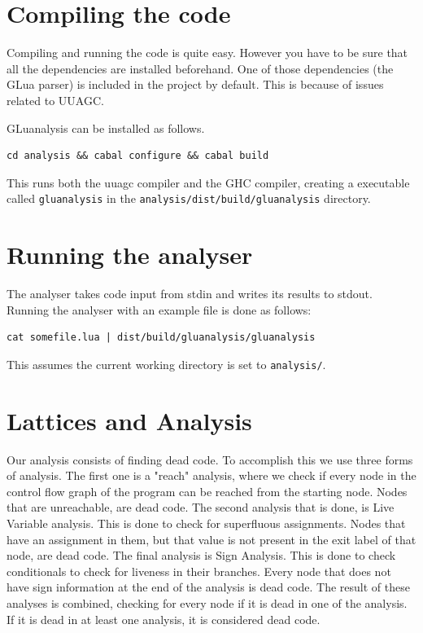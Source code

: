\documentclass[10pt]{article}
\begin{document}
\section{Compiling the code}
Compiling and running the code is quite easy. However you have to be sure that all the dependencies are installed beforehand. One of those dependencies (the GLua parser) is included in the project by default. This is because of issues related to UUAGC.

GLuanalysis can be installed as follows. 
\begin{lstlisting}[frame=single,numbers=none,caption=Compiling the project]
cd analysis && cabal configure && cabal build
\end{lstlisting}

This runs both the uuagc compiler and the GHC compiler, creating a executable called \texttt{gluanalysis} in the \texttt{analysis/dist/build/gluanalysis} directory.

\section{Running the analyser}
The analyser takes code input from stdin and writes its results to stdout. Running the analyser with an example file is done as follows:

\begin{lstlisting}[frame=single,numbers=none,caption=Running with an example file]
cat somefile.lua | dist/build/gluanalysis/gluanalysis
\end{lstlisting}

This assumes the current working directory is set to \texttt{analysis/}.

\section{Lattices and Analysis}
Our analysis consists of finding dead code. To accomplish this we use three forms of analysis. The first one is a "reach" analysis, where we check if every node in the control flow graph of the program can be reached from the starting node. Nodes that are unreachable, are dead code.
The second analysis that is done, is Live Variable analysis. This is done to check for superfluous assignments. Nodes that have an assignment in them, but that value is not present in the exit label of that node, are dead code.
The final analysis is Sign Analysis. This is done to check conditionals to check for liveness in their branches. Every node that does not have sign information at the end of the analysis is dead code.
The result of these analyses is combined, checking for every node if it is dead in one of the analysis. If it is dead in at least one analysis, it is considered dead code.
\end{document}
